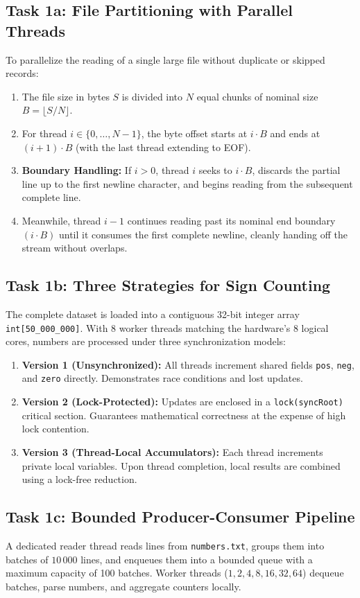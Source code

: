 \documentclass[12pt,a4paper]{article}
\begin{document}
\subsection{Task 1a: File Partitioning with Parallel Threads}
To parallelize the reading of a single large file without duplicate or skipped records:
\begin{enumerate}
    \item The file size in bytes $S$ is divided into $N$ equal chunks of nominal size $B = \lfloor S / N \rfloor$.
    \item For thread $i \in \{0, \dots, N-1\}$, the byte offset starts at $i \cdot B$ and ends at $(i+1) \cdot B$ (with the last thread extending to EOF).
    \item \textbf{Boundary Handling:} If $i > 0$, thread $i$ seeks to $i \cdot B$, discards the partial line up to the first newline character, and begins reading from the subsequent complete line.
    \item Meanwhile, thread $i - 1$ continues reading past its nominal end boundary $(i \cdot B)$ until it consumes the first complete newline, cleanly handing off the stream without overlaps.
\end{enumerate}

\subsection{Task 1b: Three Strategies for Sign Counting}
The complete dataset is loaded into a contiguous 32-bit integer array \texttt{int[50\_000\_000]}. With 8 worker threads matching the hardware's 8 logical cores, numbers are processed under three synchronization models:
\begin{enumerate}
    \item \textbf{Version 1 (Unsynchronized):} All threads increment shared fields \texttt{pos}, \texttt{neg}, and \texttt{zero} directly. Demonstrates race conditions and lost updates.
    \item \textbf{Version 2 (Lock-Protected):} Updates are enclosed in a \texttt{lock(syncRoot)} critical section. Guarantees mathematical correctness at the expense of high lock contention.
    \item \textbf{Version 3 (Thread-Local Accumulators):} Each thread increments private local variables. Upon thread completion, local results are combined using a lock-free reduction.
\end{enumerate}

\subsection{Task 1c: Bounded Producer-Consumer Pipeline}
A dedicated reader thread reads lines from \texttt{numbers.txt}, groups them into batches of $10\,000$ lines, and enqueues them into a bounded queue with a maximum capacity of 100 batches. Worker threads ($1, 2, 4, 8, 16, 32, 64$) dequeue batches, parse numbers, and aggregate counters locally.
\end{document}
